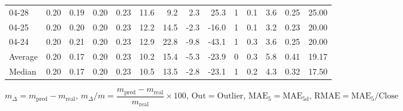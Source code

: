 \begin{threeparttable}
{\begin{tabular}{lrrrrrrrrrrrrr}
  04-28 &          0.20 &          0.19 &          0.20 &        0.23 &                11.6 &                 9.2 &        2.3 &         25.3 &              1 &                 0.1 &              3.6 &            0.25 &                  25.00 \\
  04-25 &          0.20 &          0.20 &          0.20 &        0.23 &                12.2 &                14.5 &       -2.3 &        -16.0 &              1 &                 0.1 &              3.2 &            0.23 &                  20.00 \\
  04-24 &          0.20 &          0.21 &          0.20 &        0.23 &                12.9 &                22.8 &       -9.8 &        -43.1 &              1 &                 0.3 &              3.6 &            0.25 &                  20.00 \\
Average &          0.20 &          0.17 &          0.20 &        0.23 &                10.2 &                15.4 &       -5.3 &        -23.9 &              0 &                 0.3 &              5.8 &            0.41 &                  19.17 \\
 Median &          0.20 &          0.17 &          0.20 &        0.23 &                10.5 &                13.5 &       -2.8 &        -23.1 &              1 &                 0.2 &              4.3 &            0.32 &                  17.50 \\
\bottomrule
\end{tabular}
}
\begin{tablenotes}\footnotesize
\item $m_\Delta=m_{\text{pred}}-m_{\text{real}}$,
$m_\Delta/m=\dfrac{m_{\text{pred}}-m_{\text{real}}}{m_{\text{real}}}\times100$,
$\mathrm{Out}=\text{Outlier}$,
$\mathrm{MAE}_5=\mathrm{MAE}_{5\text{d}}$,
$\mathrm{RMAE}=\mathrm{MAE}_5/\text{Close}$
\end{tablenotes}
\end{threeparttable}
\endgroup

